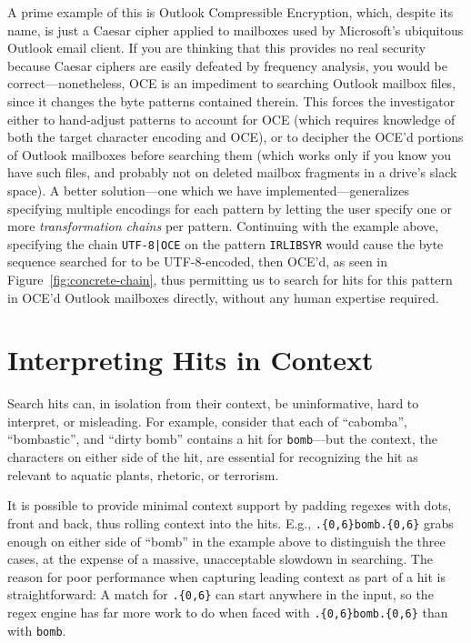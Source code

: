 \documentclass[5p,final,number,sort&compress]{elsarticle}
\newcommand{\re}[1]{\texttt{#1}}
\begin{document}
A prime example of this is Outlook Compressible Encryption, which, despite its name, is just a Caesar cipher applied to mailboxes used by Microsoft's ubiquitous Outlook email client. If you are thinking that this provides no real security because Caesar ciphers are easily defeated by frequency analysis, you would be correct---nonetheless, OCE is an impediment to searching Outlook mailbox files, since it changes the byte patterns contained therein. This forces the investigator either to hand-adjust patterns to account for OCE (which requires knowledge of both the target character encoding and OCE), or to decipher the OCE'd portions of Outlook mailboxes before searching them (which works only if you know you have such files, and probably not on deleted mailbox fragments in a drive's slack space). A better solution---one which we have implemented---generalizes specifying multiple encodings for each pattern by letting the user specify one or more \emph{transformation chains} per pattern. Continuing with the example above, specifying the chain \texttt{UTF-8|OCE} on the pattern \texttt{IRLIBSYR} would cause the byte sequence searched for to be UTF-8-encoded, then OCE'd, as seen in Figure~\ref{fig:concrete-chain}, thus permitting us to search for hits for this pattern in OCE'd Outlook mailboxes directly, without any human expertise required.

\section{Interpreting Hits in Context}

Search hits can, in isolation from their context, be uninformative, hard to interpret, or misleading. For example, consider that each of ``cabomba'', ``bombastic'', and ``dirty bomb'' contains a hit for \re{bomb}---but the context, the characters on either side of the hit, are essential for recognizing the hit as relevant to aquatic plants, rhetoric, or terrorism. 

It is possible to provide minimal context support by padding regexes with dots, front and back, thus rolling context into the hits. E.g., \re{.\{0,6\}bomb.\{0,6\}} grabs enough on either side of ``bomb'' in the example above to distinguish the three cases, at the expense of a massive, unacceptable slowdown in searching. The reason for poor performance when capturing leading context as part of a hit is straightforward: A match for \re{.\{0,6\}} can start anywhere in the input, so the regex engine has far more work to do when faced with \re{.\{0,6\}bomb.\{0,6\}} than with \re{bomb}.
\end{document}
